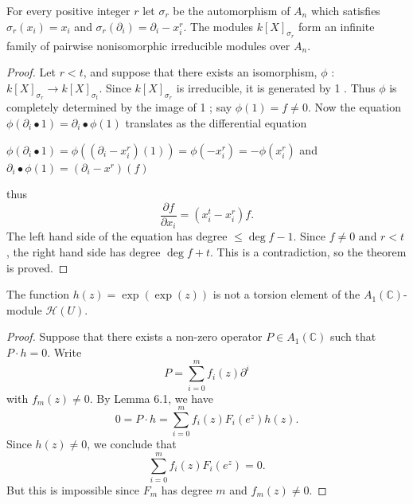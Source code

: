 \documentclass[12pt, oneside]{book}
\begin{document}
\begin{theorem}
    For every positive integer $r$ let $\sigma_r$ be the automorphism of $A_n$ which satisfies $\sigma_r\left(x_i\right)=x_i$ and $\sigma_r\left(\partial_i\right)=\partial_i-x_i^r$.
    The modules $k[X]_{\sigma_r}$ form an infinite family of pairwise nonisomorphic irreducible modules over $A_n$.
    \begin{proof}
        Let $r<t$, and suppose that there exists an isomorphism, $\phi$ : $k[X]_{\sigma_r} \longrightarrow k[X]_{\sigma_t}$. Since $k[X]_{\sigma_r}$ is irreducible, it is generated by 1 . Thus $\phi$ is completely determined by the image of 1 ; say $\phi(1)=f \neq 0$. Now the equation $\phi\left(\partial_i \bullet 1\right)=\partial_i \bullet \phi(1)$ translates as the differential equation
        \begin{center}
            $\phi(\partial_i \bullet 1)=\phi\left(\left(\partial_i-x_i^r\right)\left(1\right)\right)=\phi(-x_i^r)=-\phi(x_i^r)$
            and
            $\partial_i \bullet \phi(1)=\left(\partial_i-x^r\right)(f)$
        \end{center}
        thus
        \begin{equation*}
            \frac{\partial f}{\partial x_i}=\left(x_i^t-x_i^r\right) f .
        \end{equation*}
        The left hand side of the equation has degree $\leq \operatorname{deg} f-1$. Since $f \neq 0$ and $r<t$, the right hand side has degree $\operatorname{deg} f+t$. This is a contradiction, so the theorem is proved.
    \end{proof}
\end{theorem}




\begin{proposition}
    The function $h(z)=\exp (\exp (z))$ is not a torsion element of the $A_1(\mathbb{C})$-module $\mathcal{H}(U)$.
    \begin{proof}
        Suppose that there exists a non-zero operator $P \in A_1(\mathbb{C})$ such that $P \cdot h=0$. Write
        \begin{equation*}
            P=\sum_{i=0}^m f_i(z) \partial^i
        \end{equation*}
        with $f_m(z) \neq 0$. By Lemma 6.1, we have
        \begin{equation*}
            0=P \cdot h=\sum_{i=0}^m f_i(z) F_i\left(e^z\right) h(z) .
        \end{equation*}
        Since $h(z) \neq 0$, we conclude that
        \begin{equation*}
            \sum_{i=0}^m f_i(z) F_i\left(e^z\right)=0 .
        \end{equation*}
        But this is impossible since $F_m$ has degree $m$ and $f_m(z) \neq 0$.
    \end{proof}
\end{proposition}
\end{document}
